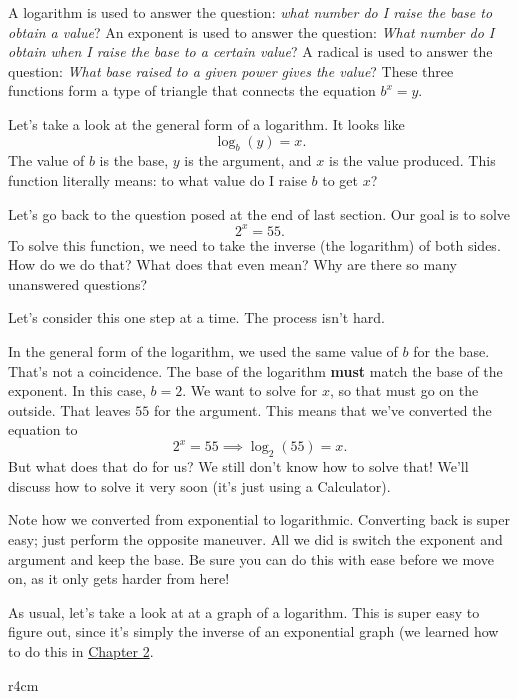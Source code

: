 \documentclass[../book.tex]{subfiles}
\begin{document}
A logarithm is used to answer the question: \textit{what number do I raise the base to obtain a value}?  An exponent is used to answer the question: \textit{What number do I obtain when I raise the base to a certain value}? A radical is used to answer the question: \textit{What base raised to a given power gives the value}?  These three functions form a type of triangle that connects the equation $b^x=y$.

Let's take a look at the general form of a logarithm.  It looks like $$\log_b(y)=x.$$  The value of $b$ is the base, $y$ is the argument, and $x$ is the value produced.  This function literally means: to what value do I raise $b$ to get $x$?

Let's go back to the question posed at the end of last section.  Our goal is to solve $$2^x=55.$$  To solve this function, we need to take the inverse (the logarithm) of both sides.  How do we do that?  What does that even mean?  Why are there so many unanswered questions?

Let's consider this one step at a time.  The process isn't hard.

In the general form of the logarithm, we used the same value of $b$ for the base.  That's not a coincidence.  The base of the logarithm \textbf{must} match the base of the exponent.  In this case, $b=2$.  We want to solve for $x$, so that must go on the outside.  That leaves $55$ for the argument.  This means that we've converted the equation to $$2^x=55 \implies \log_2(55)=x.$$ But what does that do for us?  We still don't know how to solve that!  We'll discuss how to solve it very soon (it's just using a Calculator).

\begin{remark}
Note how we converted from exponential to logarithmic.  Converting back is super easy; just perform the opposite maneuver.  All we did is switch the exponent and argument and keep the base.  Be sure you can do this with ease before we move on, as it only gets harder from here!
\end{remark}

As usual, let's take a look at at a graph of a logarithm.  This is super easy to figure out, since it's simply the inverse of an exponential graph (we learned how to do this in \hyperlink{chapter.2}{Chapter 2}.

\begin{wrapfigure}{r}{4cm}
\end{wrapfigure}
\end{document}
